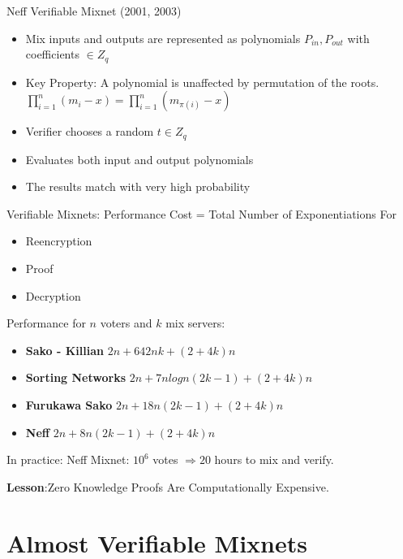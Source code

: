 \documentclass{beamer}
\newcommand*{\addsp}{\usebeamertemplate*{section page1}}
\begin{document}
\begin{frame}[allowframebreaks]{Neff Verifiable Mixnet (2001, 2003)}
\begin{itemize}
\item Mix inputs and outputs are represented as polynomials $P_{in}, P_{out}$ with coefficients $\in Z_q$
\item Key Property: A polynomial is unaffected by permutation of the roots.
$ \prod_{i=1}^n (m_i - x) = \prod_{i=1}^n (m_{\pi(i)} - x) $
\item Verifier chooses a random $t \in Z_q$
\item Evaluates both input and output polynomials
\item The results match with very high probability
\end{itemize}
\end{frame}

\begin{frame}{Verifiable Mixnets: Performance}
Cost = Total Number of Exponentiations For
\begin{itemize}
\item Reencryption
\item Proof
\item Decryption
\end{itemize}
Performance for $n$ voters and $k$ mix servers:
\begin{itemize}
\item \textbf{Sako - Killian} $2n + 642nk + (2+4k)n$
\item \textbf{Sorting Networks}  $2n + 7nlogn(2k-1) + (2+4k)n$
\item \textbf{Furukawa Sako} $2n + 18n(2k-1) + (2+4k)n$
\item \textbf{Neff} $2n + 8n(2k-1) + (2+4k)n$
\end{itemize}
In practice: Neff Mixnet: $10^6$ votes $ \Rightarrow 20$ hours to mix and verify. \\
\begin{center}
\textbf{Lesson}:Zero Knowledge Proofs Are Computationally Expensive.
\end{center}
\end{frame}

\section{Almost Verifiable Mixnets}
\begin{frame}
\addsp
\end{frame}
\end{document}
